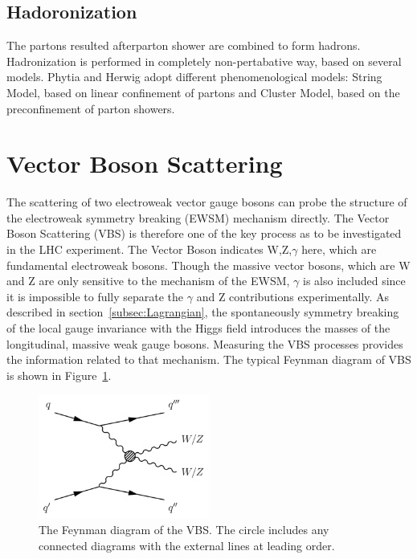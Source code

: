 \subsection{Hadoronization}
The partons resulted afterparton shower are combined to form hadrons. Hadronization is performed in completely non-pertabative way, based on several models. Phytia and Herwig adopt different phenomenological models: String Model, based on linear confinement of partons and Cluster Model, based on the preconfinement of parton showers.


\section{Vector Boson Scattering}
\label{sec:VBS}

The scattering of two electroweak vector gauge bosons can probe the structure of the electroweak symmetry breaking (EWSM) mechanism directly. 
The Vector Boson Scattering (VBS) is therefore one of the key process as to be investigated in the LHC experiment.
The Vector Boson indicates W,Z,$\gamma$ here, which are fundamental electroweak bosons. Though the massive vector bosons, which are W and Z are only sensitive to the mechanism of the  EWSM, $\gamma$ is also included since it is impossible to fully separate the $\gamma$ and Z contributions experimentally. 
As described in section~\ref{subsec:Lagrangian}, the spontaneously symmetry breaking of the local gauge invariance with the Higgs field
introduces the masses of the longitudinal, massive weak gauge bosons. 
Measuring the VBS processes provides the information related to that mechanism.
The typical Feynman diagram of VBS is shown in Figure~\ref{fig:VBS}.

\begin{figure}[tbp]
\begin{center}
 \includegraphics[width=0.50\textwidth,keepaspectratio]{figures/VBS}
\caption{
The Feynman diagram of the VBS. The circle includes any connected diagrams with the external lines at leading order.%
}
\label{fig:VBS}
\end{center}
\end{figure}

